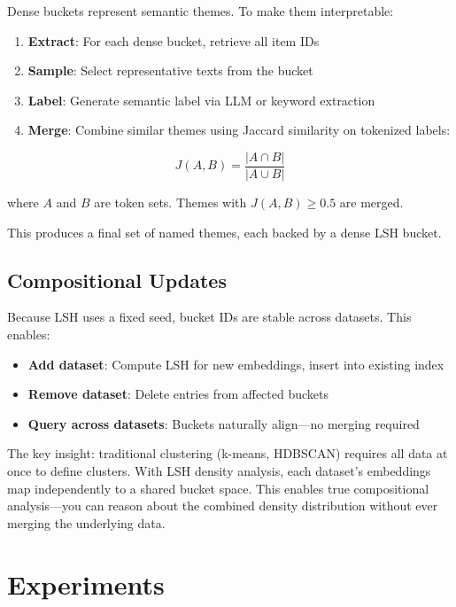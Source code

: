 \documentclass[
]{article}
\providecommand{\tightlist}{%
  \setlength{\itemsep}{0pt}\setlength{\parskip}{0pt}}
\begin{document}
Dense buckets represent semantic themes. To make them interpretable:

\begin{enumerate}
\def\labelenumi{\arabic{enumi}.}
\tightlist
\item
  \textbf{Extract}: For each dense bucket, retrieve all item IDs
\item
  \textbf{Sample}: Select representative texts from the bucket
\item
  \textbf{Label}: Generate semantic label via LLM or keyword extraction
\item
  \textbf{Merge}: Combine similar themes using Jaccard similarity on
  tokenized labels:
\end{enumerate}

\[J(A, B) = \frac{|A \cap B|}{|A \cup B|}\]

where \(A\) and \(B\) are token sets. Themes with \(J(A, B) \geq 0.5\)
are merged.

This produces a final set of named themes, each backed by a dense LSH
bucket.

\subsection{Compositional Updates}\label{compositional-updates}

Because LSH uses a fixed seed, bucket IDs are stable across datasets.
This enables:

\begin{itemize}
\tightlist
\item
  \textbf{Add dataset}: Compute LSH for new embeddings, insert into
  existing index
\item
  \textbf{Remove dataset}: Delete entries from affected buckets
\item
  \textbf{Query across datasets}: Buckets naturally align---no merging
  required
\end{itemize}

The key insight: traditional clustering (k-means, HDBSCAN) requires all
data at once to define clusters. With LSH density analysis, each
dataset's embeddings map independently to a shared bucket space. This
enables true compositional analysis---you can reason about the combined
density distribution without ever merging the underlying data.

\section{Experiments}\label{experiments}
\end{document}
